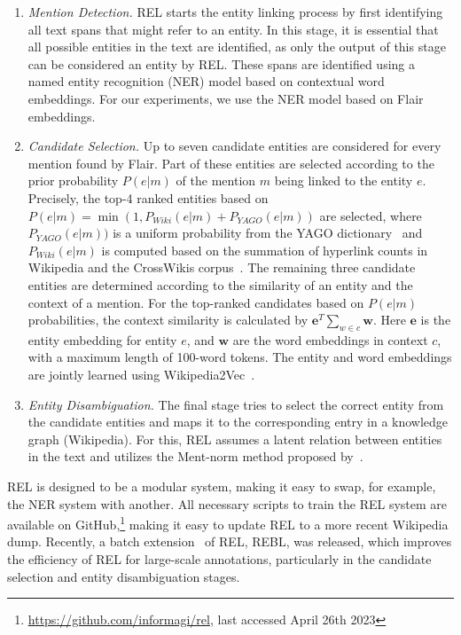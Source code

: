 \begin{enumerate}
	\item \emph{Mention Detection.} REL starts the entity linking process by first identifying all text spans that might refer to an entity. In this stage, it is essential that all possible entities in the text are identified, as only the output of this stage can be considered an entity by REL. These spans are identified using a named entity recognition (NER) model based on contextual word embeddings. For our experiments, we use the NER model based on Flair embeddings. 
	\item \emph{Candidate Selection.} Up to seven candidate entities are considered for every mention found by Flair. Part of these entities are selected according to the prior probability $P(e|m)$ of the mention $m$ being linked to the entity $e$. Precisely, the top-4 ranked entities based on $P(e|m) = \min(1, P_{\mathit{Wiki}}(e|m) + P_{\mathit{YAGO}}(e|m))$ are selected, where $P_{\mathit{YAGO}}(e|m))$ is a uniform probability from the YAGO dictionary~\citep{yago} and $P_{\mathit{Wiki}}(e|m)$ is computed based on the summation of hyperlink counts in Wikipedia and the CrossWikis corpus~\citep{crosswiki}.
	The remaining three candidate entities are determined according to the similarity of an entity and the context of a mention. For the top-ranked candidates based on $P(e|m)$ probabilities, the context similarity is calculated by $\mathbf{e}^T \sum_{w\in c}\mathbf{w}$. Here $\mathbf{e}$ is the entity embedding for entity $e$, and $\mathbf{w}$ are the word embeddings in context $c$, with a maximum length of 100-word tokens. The entity and word embeddings are jointly learned using Wikipedia2Vec~\citep{wikipedia2vec}. 
	\item \emph{Entity Disambiguation.} The final stage tries to select the correct entity from the candidate entities and maps it to the corresponding entry in a knowledge graph (Wikipedia). For this, REL assumes a latent relation between entities in the text and utilizes the Ment-norm method proposed by~\citet{ment-norm}.
\end{enumerate}

REL is designed to be a modular system, making it easy to swap, for example, the NER system with another. All necessary scripts to train the REL system are available on GitHub,\footnote{\url{https://github.com/informagi/rel}, last accessed April 26th 2023} making it easy to update REL to a more recent Wikipedia dump. Recently, a batch extension~\citep{rebl} of REL, REBL, was released, which improves the efficiency of REL for large-scale annotations, particularly in the candidate selection and entity disambiguation stages.  

